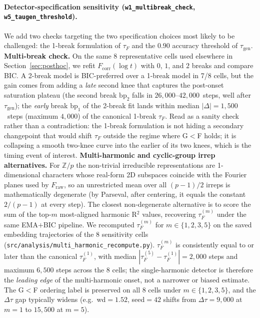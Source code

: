 \documentclass{article}
\newcommand{\taug}{\tau_{\mathrm{gen}}}
\newcommand{\tauf}{\tau_{F}}
\newcommand{\Dtau}{\Delta\tau}
\newcommand{\fcorr}{F_{\mathrm{corr}}}
\begin{document}
\paragraph{Detector-specification sensitivity (\texttt{w1\_multibreak\_check}, \texttt{w5\_taugen\_threshold}).}
We add two checks targeting the two specification choices most
likely to be challenged: the 1-break formulation of $\tauf$
and the $0.90$ accuracy threshold of $\taug$.
\textbf{Multi-break check.}
On the same 8 representative cells used elsewhere in
Section~\ref{sec:posthoc}, we refit $\fcorr(\log t)$ with
$0$, $1$, and $2$ breaks and compare BIC.
A 2-break model is BIC-preferred over a 1-break model in 7/8
cells, but the gain comes from adding a \emph{late} second knee
that captures the post-onset saturation plateau (the second break
$\mathrm{bp}_{2}$ falls in $26{,}000$--$42{,}000$~steps, well
after $\taug$); the \emph{early} break $\mathrm{bp}_{1}$ of the
2-break fit lands within median $|\Delta|{=}1{,}500$~steps
(maximum $4{,}000$) of the canonical 1-break $\tauf$.
Read as a sanity check rather than a contradiction: the 1-break
formulation is not hiding a secondary changepoint that would shift
$\tauf$ outside the regime where G$<$F holds; it is collapsing a
smooth two-knee curve into the earlier of its two knees, which is
the timing event of interest.
\textbf{Multi-harmonic and cyclic-group irrep alternatives.}
For $\mathbb{Z}/p$ the non-trivial irreducible representations are
1-dimensional characters whose real-form 2D subspaces coincide with
the Fourier planes used by $F_{\mathrm{raw}}$, so an unrestricted
mean over all $(p{-}1)/2$ irreps is mathematically degenerate
(by Parseval, after centering, it equals the constant $2/(p{-}1)$
at every step).
The closest non-degenerate alternative is to score the sum of the
top-$m$ most-aligned harmonic R$^2$ values, recovering $\tauf^{(m)}$
under the same EMA$+$BIC pipeline.
We recomputed $\tauf^{(m)}$ for $m\in\{1,2,3,5\}$ on the saved
embedding trajectories of the 8 sensitivity cells
(\texttt{src/analysis/multi\_harmonic\_recompute.py}).
$\tauf^{(m)}$ is consistently equal to or later than the canonical
$\tauf^{(1)}$, with median $|\tauf^{(5)} - \tauf^{(1)}| = 2{,}000$
steps and maximum $6{,}500$ steps across the 8 cells; the
single-harmonic detector is therefore the \emph{leading edge}
of the multi-harmonic onset, not a narrower or biased estimate.
The G$<$F ordering label is preserved on all 8 cells under
$m\in\{1,2,3,5\}$, and the $\Dtau$ gap typically widens (e.g.\
wd$=1.52$, seed$=42$ shifts from $\Dtau=9{,}000$ at $m{=}1$ to
$15{,}500$ at $m{=}5$).
\end{document}
